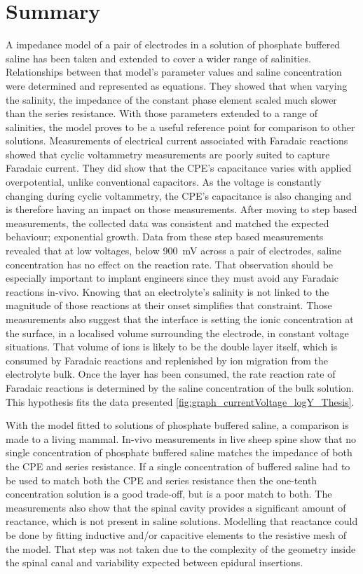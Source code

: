   \chapter{Summary}
    \label{chap:part2_summary}
    A impedance model of a pair of electrodes in a solution of phosphate buffered saline has been taken and extended to cover a wider range of salinities.
    Relationships between that model's parameter values and saline concentration were determined and represented as equations.
    They showed that when varying the salinity, the impedance of the constant phase element scaled much slower than the series resistance.
    With those parameters extended to a range of salinities, the model proves to be a useful reference point for comparison to other solutions.
    Measurements of electrical current associated with Faradaic reactions showed that cyclic voltammetry measurements are poorly suited to capture Faradaic current.
    They did show that the CPE's capacitance varies with applied overpotential, unlike conventional capacitors.
    As the voltage is constantly changing during cyclic voltammetry, the CPE's capacitance is also changing and is therefore having an impact on those measurements.
    After moving to step based measurements, the collected data was consistent and matched the expected behaviour; exponential growth.
    Data from these step based measurements revealed that at low voltages, below \SI{900}{\milli\volt} across a pair of electrodes, saline concentration has no effect on the reaction rate.
    That observation should be especially important to implant engineers since they must avoid any Faradaic reactions in-vivo.
    Knowing that an electrolyte's salinity is not linked to the magnitude of those reactions at their onset simplifies that constraint.
    Those measurements also suggest that the interface is setting the ionic concentration at the surface, in a localised volume surrounding the electrode, in constant voltage situations.
    That volume of ions is likely to be the double layer itself, which is consumed by Faradaic reactions and replenished by ion migration from the electrolyte bulk.
    Once the layer has been consumed, the rate reaction rate of Faradaic reactions is determined by the saline concentration of the bulk solution.
    This hypothesis fits the data presented \cref{fig:graph_currentVoltage_logY_Thesis}.

    With the model fitted to solutions of phosphate buffered saline, a comparison is made to a living mammal.
    In-vivo measurements in live sheep spine show that no single concentration of phosphate buffered saline matches the impedance of both the CPE and series resistance.
    If a single concentration of buffered saline had to be used to match both the CPE and series resistance then the one-tenth concentration solution is a good trade-off, but is a poor match to both.
    The measurements also show that the spinal cavity provides a significant amount of reactance, which is not present in saline solutions.
    Modelling that reactance could be done by fitting inductive and/or capacitive elements to the resistive mesh of the model.
    That step was not taken due to the complexity of the geometry inside the spinal canal and variability expected between epidural insertions.

